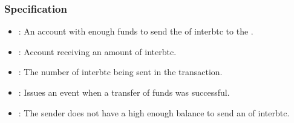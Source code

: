 \documentclass[a4paper,10pt,english]{sphinxmanual}
\begin{document}
\subsubsection{Specification}
\label{\detokenize{spec/treasury:specification}}


\begin{itemize}
\item {} 
: An account with enough funds to send the  of interbtc to the .

\item {} 
: Account receiving an amount of interbtc.

\item {} 
: The number of interbtc being sent in the transaction.

\end{itemize}

\begin{itemize}
\item {} 
: Issues an event when a transfer of funds was successful.

\end{itemize}

\begin{itemize}
\item {} 
: The sender does not have a high enough balance to send an  of interbtc.

\end{itemize}

\end{document}
